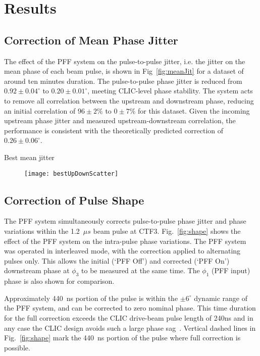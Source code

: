 \section{\label{s:results}Results}

\subsection{\label{ss:meanJit}Correction of Mean Phase Jitter}

The effect of the PFF system on the pulse-to-pulse jitter, i.e. the jitter on 
the mean phase of each beam pulse, is shown in Fig~\ref{fig:meanJit} for a 
dataset of around ten minutes duration.
The pulse-to-pulse phase jitter is reduced from  \(0.92\pm0.04^\circ\) to 
\(0.20\pm0.01^\circ\), meeting CLIC-level phase stability. 
The system acts to remove all correlation between the upstream and 
downstream phase, reducing an initial correlation of \(96\pm2\%\) to 
\(0\pm7\%\) for this dataset.
Given the incoming upstream phase jitter and 
measured upstream-downstream correlation, the performance is consistent with 
the theoretically predicted correction of \(0.26\pm0.06^\circ\).

Best mean jitter

\begin{figure}
 \centering
  \texttt{[image: bestUpDownScatter]}%
  \caption{\label{f:bestUpDownScatter}
  }
\end{figure}

\subsection{\label{ss:meanJit}Correction of Pulse Shape}
The PFF system simultaneously corrects pulse-to-pulse phase jitter and phase 
variations within the 1.2~\(\mu s\) beam pulse at CTF3. 
Fig.~\ref{fig:shape} shows the effect of the PFF system on the intra-pulse 
phase variations. The PFF system was operated in interleaved mode, with 
the correction applied to alternating pulses only. This allows 
the initial (`PFF Off') and corrected (`PFF On') downstream phase at \(\phi_3\)
to be measured at the same time. The \(\phi_1\) (PFF input) phase 
is also shown for comparison. 

Approximately 440~ns portion of the pulse is 
within the \(\pm 6^\circ\) dynamic range of the PFF system, and can be 
corrected to zero nominal phase. 
This time duration for the full correction exceeds the CLIC drive-beam pulse 
length of 240ns and in any case the CLIC design avoids such 
a large phase sag~\cite{CLICCDR}. 
Vertical dashed lines in Fig.~\ref{fig:shape} mark the 440~ns portion of 
the pulse where full correction is possible.

